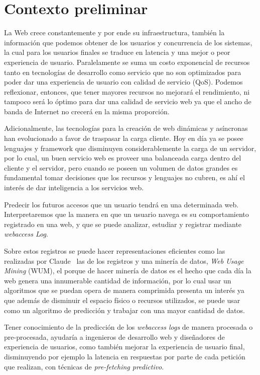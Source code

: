 \section{Contexto preliminar} 
\label{sec:preliminar}


  La Web crece constantemente y por ende su infraestructura, también la información que podemos obtener de los  usuarios y  concurrencia de los sistemas, la cual para los usuarios finales se traduce en latencia y una mejor o peor experiencia de usuario. Paralelamente se suma un costo exponencial de recursos tanto en tecnologías de desarrollo como servicio que no son optimizados para poder dar una experiencia de usuario con calidad de servicio (QoS). Podemos reflexionar, entonces, que tener mayores recursos no mejorará el rendimiento, ni tampoco será lo óptimo para dar una calidad de servicio web ya que el ancho de banda de Internet no crecerá en la misma proporción.
   
  Adicionalmente, las tecnologías para la creación de web dinámicas y asíncronas han evolucionado a favor de traspasar la carga cliente.
  Hoy en día ya se posee lenguajes y {framework} que disminuyen considerablemente la carga de un servidor, por lo cual, un buen servicio web es proveer una balanceada carga dentro del cliente y el servidor, pero cuando se poseen un volumen de datos grandes es fundamental tomar decisiones que los recursos y lenguajes no cubren, es ahí el interés de dar inteligencia a los servicios web.

  Predecir los futuros accesos que un usuario tendrá en una determinada web. Interpretaremos que la manera en que un usuario navega es su comportamiento registrado en una web, y que se puede analizar, estudiar y registrar mediante \emph{webaccess Log}. 

  Sobre estos registros se puede hacer representaciones eficientes como las realizadas por Claude\etal~\cite{Claude2014} las de los registros y una minería de datos, \emph{Web Usage Mining} (WUM), el porque de hacer minería de datos es el hecho que cada día la web genera una innumerable cantidad de información, por lo cual usar un algoritmos que se puedan opera de manera comprimida presenta un interés ya que además de disminuir el espacio físico o recursos utilizados, se puede usar como un algoritmo de predicción y trabajar con una mayor cantidad de datos.
  
  Tener conocimiento de la predicción de los \emph{webaccess logs} de manera procesada o pre-procesada, ayudaría a ingenieros de desarrollo web y diseñadores de experiencia de usuarios, como también mejorar la experiencia de usuario final, disminuyendo por ejemplo la latencia en respuestas por parte de cada petición que realizan, con técnicas de \emph{pre-fetching predictivo}.
  

